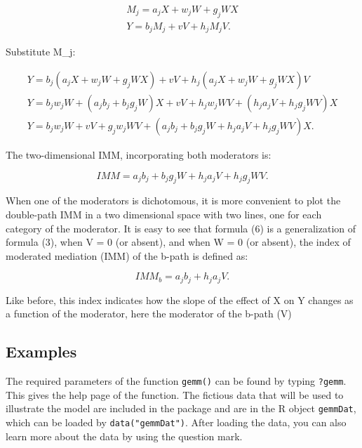 \documentclass[man,floatsintext]{apa6}
\theoremstyle{definition}
\theoremstyle{definition}
\theoremstyle{definition}
\theoremstyle{remark}
\begin{document}
\begin{equation}
 \begin{split}
M_j = a_j X + w_j W + g_j WX\\ 
Y = b_j M_j + vV + h_j M_j V. 
 \end{split}
\end{equation}

Substitute M\_j:

\begin{equation}
 \begin{split}
Y = b_j(a_j X + w_j W + g_j WX) + vV + h_j (a_j X + w_j W + g_j WX)V\\ 
Y = b_j w_j W + (a_j b_j + b_j g_j W)X + vV + h_j w_j WV + (h_j a_j V + h_j g_j WV)X\\ 
Y = b_j w_j W + vV + g_j w_j WV + (a_j b_j + b_j g_j W + h_j a_j V + h_j g_j WV)X. 
 \end{split}
\end{equation}

The two-dimensional IMM, incorporating both moderators is:

\begin{equation}
IMM = a_j b_j + b_j g_j W + h_j a_j V + h_j g_j WV.
\end{equation}

When one of the moderators is dichotomous, it is more convenient to plot
the double-path IMM in a two dimensional space with two lines, one for
each category of the moderator. It is easy to see that formula (6) is a
generalization of formula (3), when V = 0 (or absent), and when W = 0
(or absent), the index of moderated mediation (IMM) of the b-path is
defined as:

\begin{equation}
IMM_b = a_j b_j + h_j a_j V.
\end{equation}

Like before, this index indicates how the slope of the effect of X on Y
changes as a function of the moderator, here the moderator of the b-path
(V)

\subsection{Examples}\label{examples}

The required parameters of the function \texttt{gemm()} can be found by
typing \texttt{?gemm}. This gives the help page of the function. The
fictious data that will be used to illustrate the model are included in
the package and are in the R object \texttt{gemmDat}, which can be
loaded by \texttt{data("gemmDat")}. After loading the data, you can also
learn more about the data by using the question mark.
\end{document}
